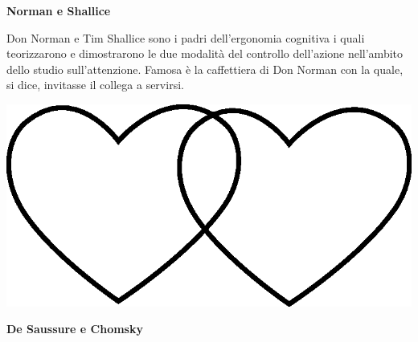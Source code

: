 \documentclass[11pt]{extarticle}
\begin{document}
\vspace*{\fill}
\newpage
\begin{center}
\vspace*{\fill}
{\Huge \textbf{Norman e Shallice\\}}
\vspace*{\fill}
\end{center}
\newpage
{}
\vspace*{\fill}
\begin{center}
Don Norman e Tim Shallice sono i padri dell'ergonomia cognitiva i quali teorizzarono e dimostrarono le due modalità del controllo dell'azione nell'ambito dello studio sull'attenzione. Famosa è la caffettiera di Don Norman con la quale, si dice, invitasse il collega a servirsi.\\
\begin{center}
\includegraphics[scale=0.1]{img/cuori_venn.eps}\\
\end{center}
\end{center}
\vspace*{\fill}
\newpage
\begin{center}
\vspace*{\fill}
{\Huge \textbf{De Saussure e Chomsky\\}}
\vspace*{\fill}
\end{center}
\newpage
{}
\vspace*{\fill}
\end{document}

